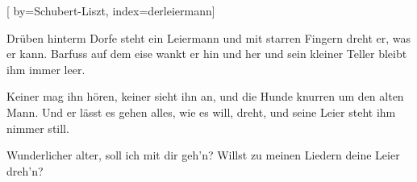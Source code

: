 
[%
    by={Schubert-Liszt},
    index={derleiermann}]


    \label{derleiermann}

    \beginverse
        Drüben hinterm Dorfe steht ein Leiermann
        und mit starren Fingern dreht er, was er kann.
        Barfuss auf dem eise wankt er hin und her
        und sein kleiner Teller bleibt ihm immer leer.
    \endverse

    \beginverse
        Keiner mag ihn hören, keiner sieht ihn an,
        und die Hunde knurren um den alten Mann.
        Und er lässt es gehen alles, wie es will,
        dreht, und seine Leier steht ihm nimmer still.
    \endverse

    \beginverse*
        Wunderlicher alter, soll ich mit dir geh'n?
        Willst zu meinen Liedern deine Leier dreh'n?
    \endverse
\endsong
